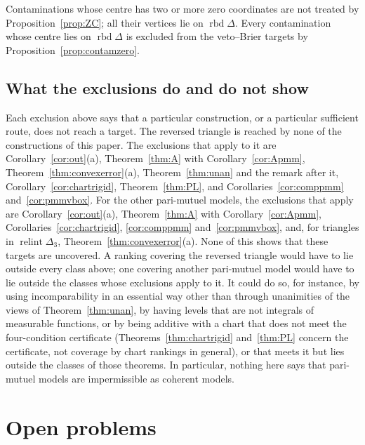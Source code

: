 \documentclass[11pt]{article}
\DeclareMathOperator{\relint}{relint}
\DeclareMathOperator{\rbd}{rbd}
\theoremstyle{plain}
\theoremstyle{definition}
\theoremstyle{remark}
\begin{document}
Contaminations whose centre has two or more zero coordinates are not treated by
Proposition~\ref{prop:ZC}; all their vertices lie on $\rbd\Delta$. Every contamination
whose centre lies on $\rbd\Delta$ is excluded from the veto--Brier targets by
Proposition~\ref{prop:contamzero}.

\subsection{What the exclusions do and do not show}

Each exclusion above says that a particular construction, or a particular sufficient
route, does not reach a target. The reversed triangle is reached by none of the
constructions of this paper. The exclusions that apply to it are
Corollary~\ref{cor:out}(a), Theorem~\ref{thm:A} with Corollary~\ref{cor:Apmm},
Theorem~\ref{thm:convexerror}(a), Theorem~\ref{thm:unan} and the remark after it,
Corollary~\ref{cor:chartrigid}, Theorem~\ref{thm:PL}, and
Corollaries~\ref{cor:comppmm} and~\ref{cor:pmmvbox}. For the other
pari-mutuel models, the exclusions that apply are Corollary~\ref{cor:out}(a),
Theorem~\ref{thm:A} with Corollary~\ref{cor:Apmm}, Corollaries~\ref{cor:chartrigid},
\ref{cor:comppmm} and~\ref{cor:pmmvbox}, and, for triangles in $\relint\Delta_3$,
Theorem~\ref{thm:convexerror}(a). None of this shows that these targets are uncovered. A
ranking covering the reversed triangle would have to lie outside every class above; one
covering another pari-mutuel model would have to lie outside the classes whose exclusions
apply to it. It could do so, for instance, by using incomparability in an essential way
other than through unanimities of the views of Theorem~\ref{thm:unan}, by having levels
that are not integrals of measurable functions, or by being additive with a chart that
does not meet the four-condition certificate (Theorems~\ref{thm:chartrigid}
and~\ref{thm:PL} concern the certificate, not coverage by chart rankings in general), or
that meets it but lies outside the classes of those theorems. In particular, nothing here says that pari-mutuel
models are impermissible as coherent models.

\section{Open problems}\label{sec:open}
\end{document}
